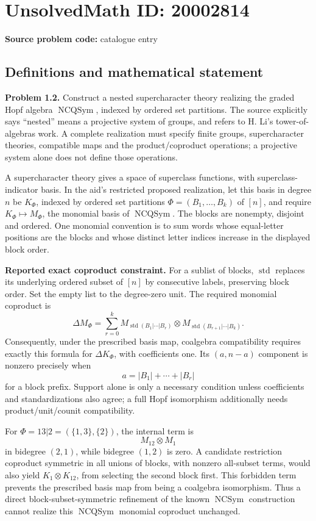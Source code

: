 \documentclass[11pt]{article}
\begin{document}
\section*{UnsolvedMath ID: 20002814}
\textbf{Source problem code:} catalogue entry
\subsection{Definitions and mathematical statement}
\textbf{Problem 1.2.} Construct a nested supercharacter theory realizing the graded Hopf algebra \(\operatorname{NCQSym}\), indexed by ordered set partitions. The source explicitly says ``nested'' means a projective system of groups, and refers to H. Li's tower-of-algebras work. A complete realization must specify finite groups, supercharacter theories, compatible maps and the product/coproduct operations; a projective system alone does not define those operations.

A supercharacter theory gives a space of superclass functions, with superclass-indicator basis. In the aid's restricted proposed realization, let this basis in degree \(n\) be \(K_\Phi\), indexed by ordered set partitions \(\Phi=(B_1,\ldots,B_k)\) of \([n]\), and require \(K_\Phi\mapsto M_\Phi\), the monomial basis of \(\operatorname{NCQSym}\). The blocks are nonempty, disjoint and ordered. One monomial convention is to sum words whose equal-letter positions are the blocks and whose distinct letter indices increase in the displayed block order.

\textbf{Reported exact coproduct constraint.} For a sublist of blocks, \(\operatorname{std}\) replaces its underlying ordered subset of \([n]\) by consecutive labels, preserving block order. Set the empty list to the degree-zero unit. The required monomial coproduct is
\[
 \Delta M_\Phi=\sum_{r=0}^k
 M_{\operatorname{std}(B_1|\cdots|B_r)}
 \otimes
 M_{\operatorname{std}(B_{r+1}|\cdots|B_k)}.
\]
Consequently, under the prescribed basis map, coalgebra compatibility requires exactly this formula for \(\Delta K_\Phi\), with coefficients one. Its \((a,n-a)\) component is nonzero precisely when
\[
 a=|B_1|+\cdots+|B_r|
\]
for a block prefix. Support alone is only a necessary condition unless coefficients and standardizations also agree; a full Hopf isomorphism additionally needs product/unit/counit compatibility.

For \(\Phi=13|2=(\{1,3\},\{2\})\), the internal term is
\[
 M_{12}\otimes M_1
\]
in bidegree \((2,1)\), while bidegree \((1,2)\) is zero. A candidate restriction coproduct symmetric in all unions of blocks, with nonzero all-subset terms, would also yield \(K_1\otimes K_{12}\), from selecting the second block first. This forbidden term prevents the prescribed basis map from being a coalgebra isomorphism. Thus a direct block-subset-symmetric refinement of the known \(\operatorname{NCSym}\) construction cannot realize this \(\operatorname{NCQSym}\) monomial coproduct unchanged.
\end{document}
